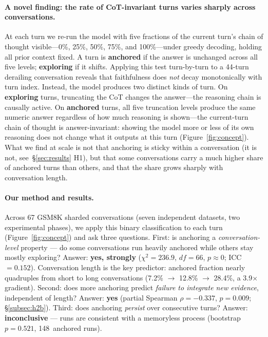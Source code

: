 \documentclass{article}
\begin{document}
\paragraph{A novel finding: the rate of CoT-invariant turns varies sharply across conversations.}
At each turn we re-run the model with five fractions of the current
turn's chain of thought visible---0\%, 25\%, 50\%, 75\%, and 100\%---under
greedy decoding, holding all prior context fixed.
A turn is \textbf{anchored} if the answer is unchanged across all five
levels; \textbf{exploring} if it shifts.
Applying this test turn-by-turn to a 44-turn
derailing conversation reveals that faithfulness does \emph{not}
decay monotonically with turn index.
Instead, the model produces two distinct kinds of turn.
On \textbf{exploring} turns, truncating the CoT changes the
answer---the reasoning chain is causally active.
On \textbf{anchored} turns, all five truncation levels produce the
same numeric answer regardless of how much reasoning is
shown---the current-turn chain of thought is answer-invariant: showing
the model more or less of its own reasoning does not change what it
outputs at this turn (Figure~\ref{fig:concept}).
What we find at scale is not that anchoring is sticky within a
conversation (it is not, see~\S\ref{sec:results} H1), but that
some conversations carry a much higher share of anchored turns
than others, and that the share grows sharply with conversation
length.

\paragraph{Our method and results.}
Across 67 GSM8K sharded conversations (seven independent datasets,
two experimental phases), we apply this binary classification to
each turn (Figure~\ref{fig:concept}) and ask three questions.
First: is anchoring a \emph{conversation-level} property --- do
some conversations run heavily anchored while others stay mostly
exploring?
Answer: \textbf{yes, strongly}
($\chi^2 = 236.9$, $df=66$, $p \approx 0$; ICC~$=0.152$).
Conversation length is the key predictor: anchored fraction nearly
quadruples from short to long conversations
(7.2\% $\to$ 12.8\% $\to$ 28.4\%, a 3.9$\times$ gradient).
Second: does more anchoring predict \emph{failure to integrate
new evidence}, independent of length?
Answer: \textbf{yes} (partial Spearman $\rho=-0.337$, $p=0.009$;
\S\ref{subsec:h2b}).
Third: does anchoring \emph{persist} over consecutive turns?
Answer: \textbf{inconclusive} --- runs are consistent with a
memoryless process (bootstrap $p=0.521$, 148~anchored runs).
\end{document}
